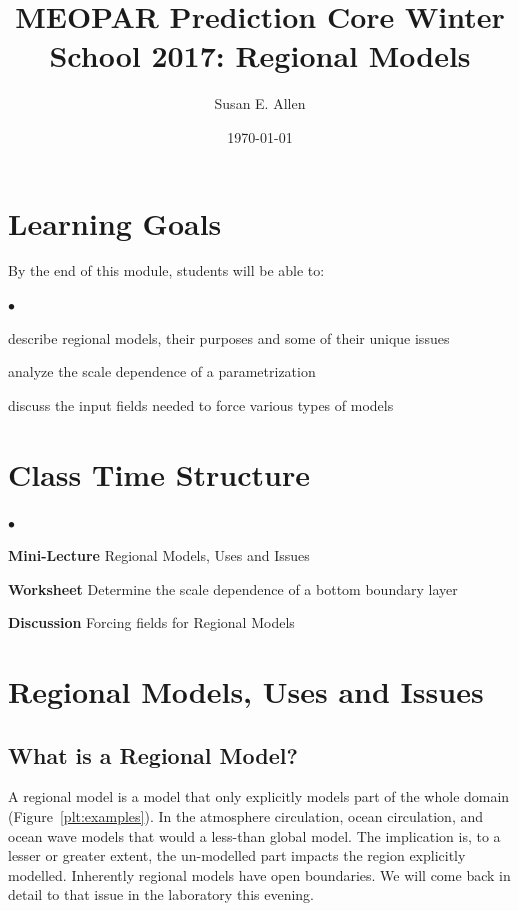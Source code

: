\documentclass[letterpaper,12pt]{article}
\newcounter{lnum}
\newenvironment{abbrevlist}%
  {\begin{list}{$\bullet$}{\setlength{\leftmargin}{2em}%
               \setlength{\itemindent}{0em}%
               \setlength{\itemsep}{0pt}%
               \setlength{\parsep}{0pt}%
               \setlength{\topsep}{2pt}%
               \usecounter{lnum} } }{\end{list}}
\begin{document}
\title{MEOPAR Prediction Core Winter School 2017: Regional Models}
\author{Susan E. Allen }
\date{\today}
 \maketitle


\setcounter{tocdepth}{3}

\setlength{\parskip}{0ex}


\section{Learning Goals}

By the end of this module, students will be able to:

\begin{abbrevlist}
\item describe regional models, their purposes and some of their unique issues
\item analyze the scale dependence of a parametrization
\item discuss the input fields needed to force various types of models
\end{abbrevlist}

\section{Class Time Structure}

\begin{abbrevlist}
\item {\bf Mini-Lecture} Regional Models, Uses and Issues
\item {\bf Worksheet} Determine the scale dependence of a bottom boundary layer
\item {\bf Discussion} Forcing fields for Regional Models
\end{abbrevlist}

\section{Regional Models, Uses and Issues}

\subsection{What is a Regional Model?}

A regional model is a model that only explicitly models part of the whole domain (Figure~\ref{plt:examples}).  In the atmosphere circulation, ocean circulation, and ocean wave models that would a less-than global model.  The implication is, to a lesser or greater extent, the un-modelled part impacts the region explicitly modelled.  Inherently regional models have open boundaries.  We will come back in detail to that issue in the laboratory this evening.
\end{document}
